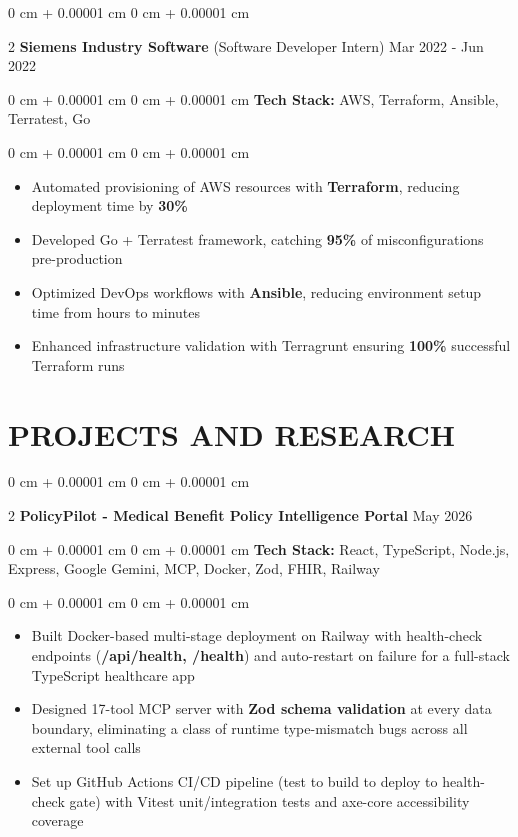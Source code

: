 \documentclass[9pt, letterpaper]{article}
\newenvironment{highlights}{
    \begin{itemize}[
        topsep=0.05 cm,
        parsep=0 pt,
        partopsep=0pt,
        itemsep=0pt,
        leftmargin=10pt
    ]
}{
    \end{itemize}
} %
\newenvironment{onecolentry}{
    \begin{adjustwidth}{
        0 cm + 0.00001 cm}{
        0 cm + 0.00001 cm}
}{
    \end{adjustwidth}
} %
\newenvironment{twocolentry}[2][]{
    \onecolentry
    \def\secondColumn{#2}
    \setcolumnwidth{\fill, 4.5 cm}
    \begin{paracol}{2}
}{
    \switchcolumn \raggedleft \secondColumn
    \end{paracol}
    \endonecolentry
} %
\begin{document}
    \begin{twocolentry}{Mar 2022 - Jun 2022}\textbf{Siemens Industry Software} (Software Developer Intern)\end{twocolentry}
    \begin{onecolentry}\textbf{Tech Stack:} AWS, Terraform, Ansible, Terratest, Go \end{onecolentry}
    \begin{onecolentry}
        \begin{highlights}
            \item Automated provisioning of AWS resources with \textbf{Terraform}, reducing deployment time by \textbf{30\%}
            \item Developed Go + Terratest framework, catching \textbf{95\%} of misconfigurations pre-production
            \item Optimized DevOps workflows with \textbf{Ansible}, reducing environment setup time from hours to minutes
            \item Enhanced infrastructure validation with Terragrunt ensuring \textbf{100\%} successful Terraform runs
        \end{highlights}
    \end{onecolentry}

\section{PROJECTS AND RESEARCH}

    \begin{twocolentry}
        {May 2026}\textbf{PolicyPilot - Medical Benefit Policy Intelligence Portal}    \end{twocolentry}
    \begin{onecolentry}\textbf{Tech Stack:} React, TypeScript, Node.js, Express, Google Gemini, MCP, Docker, Zod, FHIR, Railway \end{onecolentry}
    \begin{onecolentry}
        \begin{highlights}
            \item Built Docker-based multi-stage deployment on Railway with health-check endpoints (\textbf{/api/health, /health}) and auto-restart on failure for a full-stack TypeScript healthcare app
            \item Designed 17-tool MCP server with \textbf{Zod schema validation} at every data boundary, eliminating a class of runtime type-mismatch bugs across all external tool calls
            \item Set up GitHub Actions CI/CD pipeline (test to build to deploy to health-check gate) with Vitest unit/integration tests and axe-core accessibility coverage
        \end{highlights}
    \end{onecolentry}
    \vspace{0.04 cm}
\end{document}
